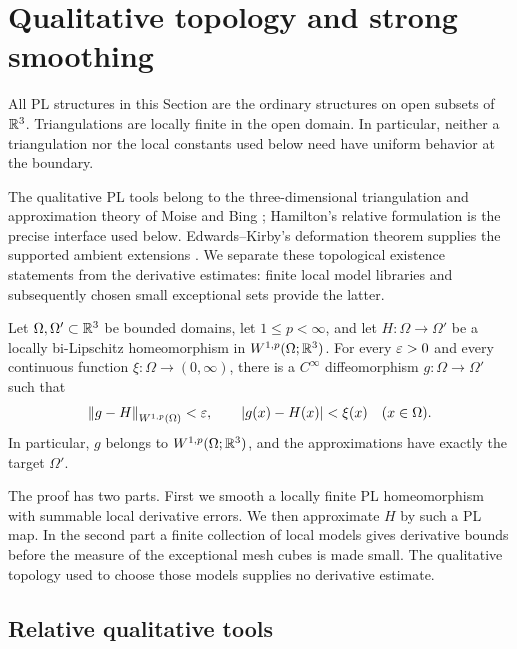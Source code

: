 \section{Qualitative topology and strong smoothing}
\label{sec:smoothing}

All PL structures in this Section are the ordinary structures on open
subsets of $\mathbb R^3$.  Triangulations are locally finite in the open domain.
In particular, neither a triangulation nor the local constants used below
need have uniform behavior at the boundary.

The qualitative PL tools belong to the three-dimensional triangulation
and approximation theory of Moise and Bing
\cite{Moise1952Approximation,Moise1952Triangulation,Bing1959}; Hamilton's
relative formulation \cite{Hamilton1976} is the precise interface used
below. Edwards--Kirby's deformation theorem supplies the supported
ambient extensions \cite{EdwardsKirby1971}. We separate these
topological existence statements from the derivative estimates:
finite local model libraries and subsequently chosen small exceptional
sets provide the latter.

\begin{theorem}
\label{sm:smoothing}
Let $\Omega,\Omega'\subset\mathbb R^3$ be bounded domains, let
$1\le p<\infty$, and let $H:\Omega\to\Omega'$ be a locally
bi-Lipschitz homeomorphism in $W^{1,p}(\Omega;\mathbb R^3)$.  For every
$\varepsilon>0$ and every continuous function $\xi:\Omega\to(0,\infty)$,
there is a $C^\infty$ diffeomorphism $g:\Omega\to\Omega'$ such that
\begin{equation}
 \label{sm:smoothing-conclusion}
 \left\lVert g-H\right\rVert_{W^{1,p}(\Omega)}<\varepsilon,
 \qquad |g(x)-H(x)|<\xi(x)\quad(x\in\Omega).
\end{equation}
In particular, $g$ belongs to $W^{1,p}(\Omega;\mathbb R^3)$, and the
approximations have exactly the target $\Omega'$.
\end{theorem}

The proof has two parts.  First we smooth a locally finite PL
homeomorphism with summable local derivative errors.  We then approximate
$H$ by such a PL map.  In the second part a finite collection of local
models gives derivative bounds before the measure of the exceptional
mesh cubes is made small.  The qualitative topology used to choose those
models supplies no derivative estimate.

\subsection{Relative qualitative tools}

